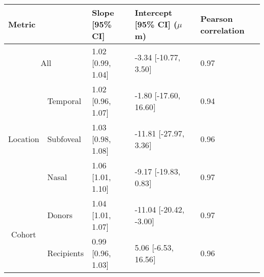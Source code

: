\begin{tabular}{cllll}
\toprule
\multicolumn{2}{l}{Metric} & Slope {[}95\% CI{]} & Intercept {[}95\% CI{]} ($\mu$m) & Pearson correlation \\
\midrule
\multicolumn{2}{c}{All} & 1.02 {[}0.99, 1.04{]} & -3.34 {[}-10.77, 3.50{]} & 0.97 \\
\multirow{3}{*}{Location} & Temporal & 1.02 {[}0.96, 1.07{]} & -1.80 {[}-17.60, 16.60{]} & 0.94 \\
 & Subfoveal & 1.03 {[}0.98, 1.08{]} & -11.81 {[}-27.97, 3.36{]} & 0.96 \\
 & Nasal & 1.06 {[}1.01, 1.10{]} & -9.17 {[}-19.83, 0.83{]} & 0.97 \\
\multirow{2}{*}{Cohort} & Donors & 1.04 {[}1.01, 1.07{]} & -11.04 {[}-20.42, -3.00{]} & 0.97 \\
 & Recipients & 0.99 {[}0.96, 1.03{]} & 5.06 {[}-6.53, 16.56{]} & 0.96 \\
 \bottomrule
\end{tabular}
